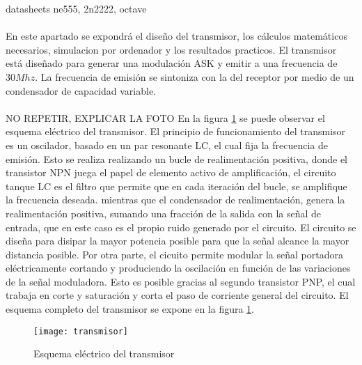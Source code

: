datasheets ne555, 2n2222, octave
\paragraph{}
En este apartado se expondr\'a el diseño del transmisor, los c\'alculos matem\'aticos necesarios, simulacion por ordenador y los resultados practicos.
El transmisor está diseñado para generar una modulación ASK y emitir a una frecuencia de $30Mhz$. La frecuencia de emisión se sintoniza con la del receptor por medio de un condensador de capacidad variable.
\paragraph{}
NO REPETIR, EXPLICAR LA FOTO
En la figura \ref{fig:tx} se puede observar el esquema eléctrico del transmisor.
El principio de funcionamiento del transmisor es un oscilador, basado en un par resonante LC, el cual fija la frecuencia de emisión. Esto se realiza realizando un bucle de realimentación positiva, donde el transistor NPN juega el papel de elemento activo de amplificación, el circuito tanque LC es el filtro que permite que en cada iteración del bucle, se amplifique la frecuencia deseada. mientras que el condensador de realimentación, genera la realimentación positiva, sumando una fracción de la salida con la señal de entrada, que en este caso es el propio ruido generado por el circuito.
El circuito se diseña para disipar la mayor potencia posible para que la señal alcance la mayor distancia posible. 
Por otra parte, el cicuito permite modular la señal portadora eléctricamente cortando y produciendo la oscilación en función de las variaciones de la señal moduladora. Esto es posible gracias al segundo transistor PNP, el cual trabaja en corte y saturaci\'on y corta el paso de corriente general del circuito.
El esquema completo del transmisor se expone en la figura \ref{fig:tx}.

\begin{figure}[h]
    \centering
    \texttt{[image: transmisor]}
    \caption{Esquema el\'ectrico del transmisor}
    \label{fig:tx}
\end{figure}

